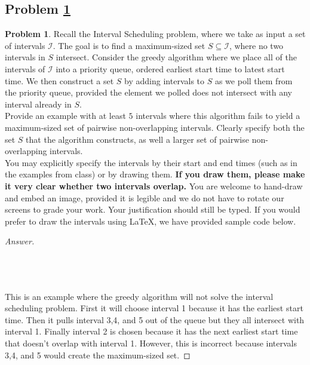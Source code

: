\documentclass[11pt]{article}
\theoremstyle{definition}
\theoremstyle{definition}
\newtheorem{required}{Problem}
\theoremstyle{definition}
\newcommand{\interval}[4]{\draw (#2, #1) -- (#3, #1); %
\draw (#2, #1-0.11) -- (#2, #1+0.11); %
\draw (#3, #1-0.11) -- (#3, #1+0.11); %
\node[] at (#2-0.25, #1) {#4};
}
\begin{document}
\subsection{Problem \ref{GreedyFail1}}
\begin{required} \label{GreedyFail1}
Recall the \textsf{Interval Scheduling} problem, where we take as input a set of intervals $\mathcal{I}$. The goal is to find a maximum-sized set $S \subseteq \mathcal{I}$, where no two intervals in $S$ intersect. Consider the greedy algorithm where we place all of the intervals of $\mathcal{I}$ into a priority queue, ordered earliest start time to latest start time. We then construct a set $S$ by adding intervals to $S$ as we poll them from the priority queue, provided the element we polled does not intersect with any interval already in $S$. \\

\noindent Provide an example with at least $5$ intervals where this algorithm fails to yield a maximum-sized set of pairwise non-overlapping intervals. Clearly specify both the set $S$ that the algorithm constructs, as well a larger set of pairwise non-overlapping intervals. \\

\noindent You may explicitly specify the intervals by their start and end times (such as in the examples from class) or by drawing them. \textbf{If you draw them, please make it very clear whether two intervals overlap.} You are welcome to hand-draw and embed an image, provided it is legible and we do not have to rotate our screens to grade your work. Your justification should still be typed. If you would prefer to draw the intervals using \LaTeX, we have provided sample code below. \\
\end{required}



\begin{proof}[Answer] $ $ \\ \\
$ $ \\ \\
This is an example where the greedy algorithm will not solve the interval scheduling problem. First it will choose interval 1 because it has the earliest start time. Then it pulls interval 3,4, and 5 out of the queue but they all intersect with interval 1. Finally interval 2 is chosen because it has the next earliest start time that doesn't overlap with interval 1. However, this is incorrect because intervals 3,4, and 5 would create the maximum-sized set.
\end{proof}
\end{document}
